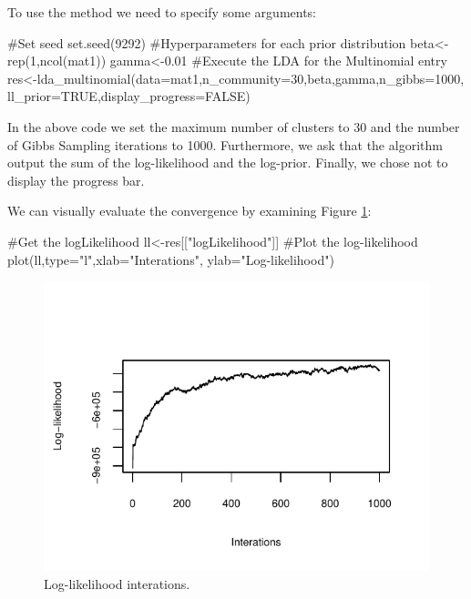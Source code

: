 \documentclass[article]{jss}
\begin{document}
To use the  method we need to specify some
arguments:

\begin{CodeChunk}
\begin{CodeInput}
#Set seed
set.seed(9292)
#Hyperparameters for each prior distribution
beta<-rep(1,ncol(mat1))
gamma<-0.01
#Execute the LDA for the Multinomial entry
res<-lda_multinomial(data=mat1,n_community=30,beta,gamma,n_gibbs=1000,
                     ll_prior=TRUE,display_progress=FALSE)
\end{CodeInput}
\end{CodeChunk}

In the above code we set the maximum number of clusters to 30 and the
number of Gibbs Sampling iterations to 1000. Furthermore, we ask that
the algorithm output the sum of the log-likelihood and the log-prior.
Finally, we chose not to display the progress bar.

We can visually evaluate the convergence by examining Figure
\ref{figure:fig001}:

\begin{CodeChunk}
\begin{CodeInput}
#Get the logLikelihood
ll<-res[["logLikelihood"]]
#Plot the log-likelihood
plot(ll,type="l",xlab="Interations",
                 ylab="Log-likelihood")
\end{CodeInput}
\end{CodeChunk}

\begin{figure}[htbp]
  \centering
  \includegraphics{plot001.pdf}
  \caption{Log-likelihood interations.}
  \label{figure:fig001}
\end{figure}
\end{document}
